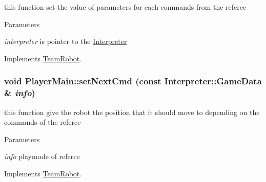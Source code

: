 this function set the value of parameters for each commands from the referee 


\begin{DoxyParams}{Parameters}
\item[{\em interpreter}]is pointer to the \hyperlink{classInterpreter}{Interpreter} \end{DoxyParams}


Implements \hyperlink{classTeamRobot_a34c0fd6986c510d4025e5752b3c0e49a}{TeamRobot}.

\hypertarget{classPlayerMain_a8f0320189df15529662c7f16d2f74084}{
\subsubsection[{setNextCmd}]{\setlength{\rightskip}{0pt plus 5cm}void PlayerMain::setNextCmd (const {\bf Interpreter::GameData} \& {\em info})}}
\label{classPlayerMain_a8f0320189df15529662c7f16d2f74084}


this function give the robot the position that it should move to depending on the commands of the referee 


\begin{DoxyParams}{Parameters}
\item[{\em info}]playmode of referee \end{DoxyParams}


Implements \hyperlink{classTeamRobot_a65f9a2b7464dfac3f4a0336810cf574f}{TeamRobot}.



